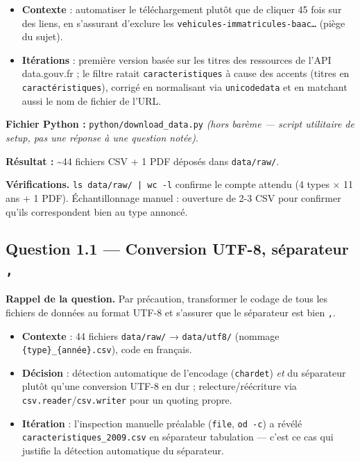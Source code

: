 \documentclass[11pt,a4paper]{article}
\newcommand{\rub}[2]{\textbf{\textcolor{#1}{#2}}}
\begin{document}
\begin{agentbox}
\begin{itemize}
\item \textbf{Contexte} : automatiser le téléchargement plutôt que de cliquer 45 fois sur des liens, en s'assurant d'exclure les \texttt{vehicules-immatricules-baac…} (piège du sujet).
\item \textbf{Itérations} : première version basée sur les titres des ressources de l'API data.gouv.fr ; le filtre ratait \texttt{caracteristiques} à cause des accents (titres en \texttt{caractéristiques}), corrigé en normalisant via \texttt{unicodedata} et en matchant aussi le nom de fichier de l'URL.
\end{itemize}
\end{agentbox}

\rub{labfichier}{Fichier Python :} \texttt{python/download\_data.py} \emph{(hors barème — script utilitaire de setup, pas une réponse à une question notée)}.

\rub{labresultat}{Résultat :} \textasciitilde{}44 fichiers CSV + 1 PDF déposés dans \texttt{data/raw/}.

\rub{labanalyse}{Vérifications.} \texttt{ls data/raw/ | wc -l} confirme le compte attendu (4 types × 11 ans + 1 PDF). Échantillonnage manuel : ouverture de 2-3 CSV pour confirmer qu'ils correspondent bien au type annoncé.

\clearpage
\subsection*{Question 1.1 — Conversion UTF-8, séparateur \texttt{,}}

\rub{labrappel}{Rappel de la question.} Par précaution, transformer le codage de tous les fichiers de données au format UTF-8 et s'assurer que le séparateur est bien \texttt{,}.

\begin{agentbox}
\begin{itemize}
\item \textbf{Contexte} : 44 fichiers \texttt{data/raw/} → \texttt{data/utf8/} (nommage \texttt{\{type\}\_\{année\}.csv}), code en français.
\item \textbf{Décision} : détection automatique de l'encodage (\texttt{chardet}) \emph{et} du séparateur plutôt qu'une conversion UTF-8 en dur ; relecture/réécriture via \texttt{csv.reader}/\texttt{csv.writer} pour un quoting propre.
\item \textbf{Itération} : l'inspection manuelle préalable (\texttt{file}, \texttt{od -c}) a révélé \texttt{caracteristiques\_2009.csv} en séparateur tabulation — c'est ce cas qui justifie la détection automatique du séparateur.
\end{itemize}
\end{agentbox}
\end{document}
